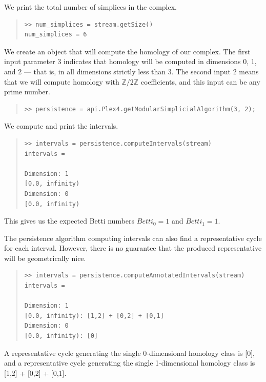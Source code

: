 \documentclass[amscd, amssymb, verbatim]{amsart}[12pt]
\theoremstyle{remark}
\theoremstyle{remark}
\theoremstyle{remark}
\newcommand{\Z}{\mathbb{Z}}
\begin{document}
We print the total number of simplices in the complex.

\begin{quote} \begin{verbatim}
>> num_simplices = stream.getSize()
num_simplices = 6
\end{verbatim} \end{quote}

We create an object that will compute the homology of our complex. The first input parameter 3 indicates that homology will be computed in dimensions 0, 1, and 2 --- that is, in all dimensions strictly less than 3. The second input 2 means that we will compute homology with $\Z/2\Z$ coefficients, and this input can be any prime number.

\begin{quote} \begin{verbatim}
>> persistence = api.Plex4.getModularSimplicialAlgorithm(3, 2);
\end{verbatim} \end{quote}

We compute and print the intervals.

\begin{quote} \begin{verbatim}
>> intervals = persistence.computeIntervals(stream)
intervals =

Dimension: 1
[0.0, infinity)
Dimension: 0
[0.0, infinity)
\end{verbatim} \end{quote}

This gives us the expected Betti numbers $Betti_0=1$ and $Betti_1=1$.

The persistence algorithm computing intervals can also find a representative cycle for each interval. However, there is no guarantee that the produced representative will be geometrically nice.

\begin{quote} \begin{verbatim}
>> intervals = persistence.computeAnnotatedIntervals(stream)
intervals =

Dimension: 1
[0.0, infinity): [1,2] + [0,2] + [0,1]
Dimension: 0
[0.0, infinity): [0]
\end{verbatim} \end{quote}

A representative cycle generating the single 0-dimensional homology class is [0], and a representative cycle generating the single 1-dimensional homology class is [1,2] + [0,2] + [0,1].
\end{document}
